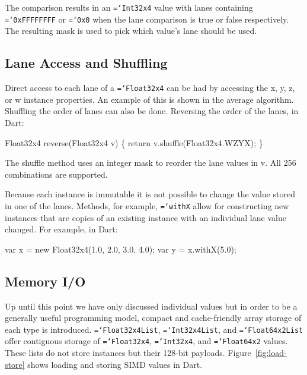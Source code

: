 \documentclass{sigplanconf}
\newcommand{\ttt}[1]{{\texttt{\hyphenchar\font=`\-\relax #1}}}%
\begin{document}
The comparison results in an \ttt{Int32x4} value with lanes containing
\ttt{0xFFFFFFFF} or \ttt{0x0} when the lane comparison is true or false
respectively. The resulting mask is used to pick which value's lane should be
used.

\subsection{Lane Access and Shuffling}

Direct access to each lane of a \ttt{Float32x4} can be had by accessing the x,
y, z, or w instance properties. An example of this is shown in the average
algorithm. Shuffling the order of lanes can also be done. Reversing the order of
the lanes, in Dart:

\begin{small}
\begin{program}[style=tt]
Fl\tab{}oat32x4 reverse(Float32x4 v) \{
  return v.shuffle(Float32x4.WZYX);\untab{}
\}
\end{program}
\end{small}

The shuffle method uses an integer mask to reorder the lane values in v. All 256
combinations are supported.

Because each instance is immutable it is not possible to change the value stored
in one of the lanes. Methods, for example, \ttt{withX} allow for constructing
new instances that are copies of an existing instance with an individual lane
value changed. For example, in Dart:

\begin{small}
\begin{program}[style=tt]
var x = new Float32x4(1.0, 2.0, 3.0, 4.0);
var y = x.withX(5.0);
\end{program}
\end{small}

\subsection{Memory I/O}

Up until this point we have only discussed individual values but in order to be
a generally useful programming model, compact and cache-friendly array storage
of each type is introduced. \ttt{Float32x4List}, \ttt{Int32x4List}, and
\ttt{Float64x2List} offer contiguous storage of \ttt{Float32x4}, \ttt{Int32x4},
and \ttt{Float64x2} values. These lists do not store instances
but their 128-bit payloads. Figure~\ref{fig:load-store} shows loading and
storing SIMD values in Dart.
\end{document}
